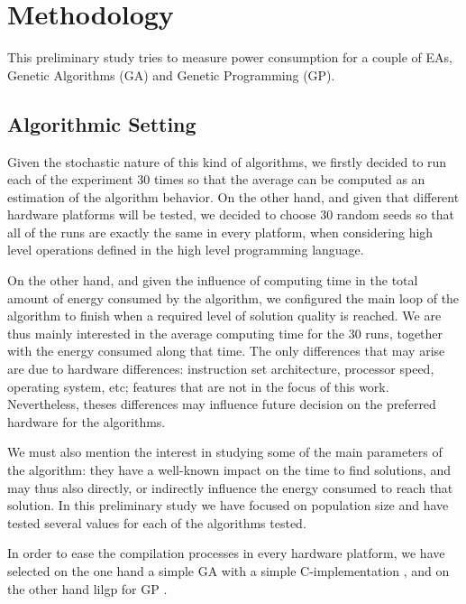 \section{Methodology}
\label{methodology}

This preliminary study tries to measure power consumption for a couple
of EAs, Genetic Algorithms (GA) and Genetic Programming (GP). 

\subsection{Algorithmic Setting}

Given the stochastic nature of this kind of algorithms, we firstly decided to run each of the experiment 30 times so that the average can be computed as an estimation of the algorithm behavior.  On the other hand, and given that different hardware platforms will be tested, we decided to choose 30 random seeds so that all of the runs are exactly the same in every platform, when considering high level operations defined in the high level programming language.

On the other hand, and given the influence of computing time in the total amount of energy consumed by the algorithm, we configured the main loop of the algorithm to finish when a required level of solution quality is reached. We are thus mainly interested in the average computing time for the 30 runs, together with the energy consumed along that time.  The only differences that may arise are due to hardware differences:  instruction set architecture, processor speed, operating system, etc;  %
features that are not in the focus of this work.  Nevertheless, theses differences may influence future decision on the preferred hardware for the algorithms.  

We must also mention the interest in studying some of the main parameters of the algorithm:  they have a well-known impact on the time to find solutions, and may thus also directly, or indirectly influence the energy consumed to reach that solution.  In this preliminary study we have focused on population size and have tested several values for each of the algorithms tested.

In order to ease the compilation processes in every hardware platform, we have selected on the one hand a simple GA \cite{michalewicz} with a simple C-implementation \cite{web_algoritmo}, and on the other hand lilgp for GP \cite{lilgp}.  

